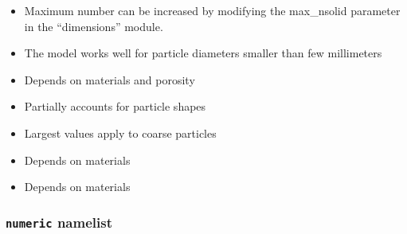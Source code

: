 \begin{itemize}

\item
{}
{Maximum number can be increased by modifying the max\_nsolid parameter
in the ``dimensions'' module.}

\item
{}
{The model works well for particle diameters smaller than few millimeters}

\item
{}
{Depends on materials and porosity}

\item
{}
{Partially accounts for particle shapes}

\item
{}
{Largest values apply to coarse particles}

\item
{}
{Depends on materials}

\item
{}
{Depends on materials}

\end{itemize}

\subsubsection{ {\tt numeric} namelist}


